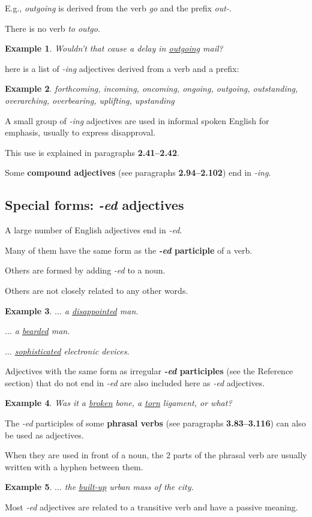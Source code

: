 \documentclass[oneside]{book}
\numberwithin{equation}{section}
\newtheorem{example}{Example}[section]
\begin{document}
E.g., \textit{outgoing} is derived from the verb \textit{go} and the prefix \textit{out-}.

There is no verb \textit{to outgo}.
\begin{example}
    Wouldn't that cause a delay in \underline{outgoing} mail?
\end{example}
here is a list of \textit{-ing} adjectives derived from a verb and a prefix:
\begin{example}
    forthcoming, incoming, oncoming, ongoing, outgoing, outstanding, overarching, overbearing, uplifting, upstanding
\end{example}
%
\noindent{} A small group of \textit{-ing} adjectives are used in informal spoken English for emphasis, usually to express disapproval.

This use is explained in paragraphs \textbf{2.41--2.42}.

%
Some \textbf{compound adjectives} (see paragraphs \textbf{2.94--2.102}) end in \textit{-ing}.

\subsection{Special forms: \textit{-ed} adjectives}
\noindent{} A large number of English adjectives end in \textit{-ed}.

Many of them have the same form as the \textbf{\textit{-ed} participle} of a verb.

Others are formed by adding \textit{-ed} to a noun.

Others are not closely related to any other words.
\begin{example}
    $\ldots$ a \underline{disappointed} man.
    
    $\ldots$ a \underline{bearded} man.
    
    $\ldots$ \underline{sophisticated} electronic devices.
\end{example}
%
\noindent{} Adjectives with the same form as irregular \textbf{\textit{-ed} participles} (see the Reference section) that do not end in \textit{-ed} are also included here as \textit{-ed} adjectives.
\begin{example}
    Was it a \underline{broken} bone, a \underline{torn} ligament, or what?
\end{example}
The \textit{-ed} participles of some \textbf{phrasal verbs} (see paragraphs \textbf{3.83--3.116}) can also be used as adjectives.

When they are used in front of a noun, the 2 parts of the phrasal verb are usually written with a hyphen between them.
\begin{example}
    $\ldots$ the \underline{built-up} urban mass of the city.
\end{example}
%
\noindent{} Most \textit{-ed} adjectives are related to a transitive verb and have a passive meaning.
\end{document}
